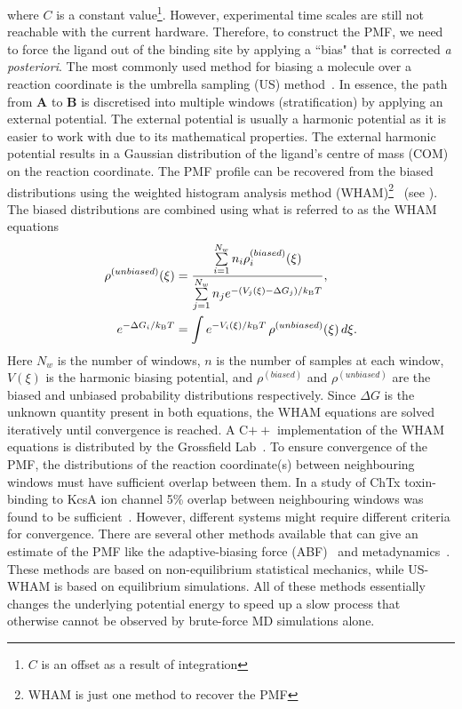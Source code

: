 where $C$ is a constant value\footnote{$C$ is an offset as a result of integration}. However, 
experimental time scales are still not reachable with the current hardware. Therefore, to 
construct the PMF, we need to force the ligand out of the binding site by applying a ``bias" 
that is corrected {\it a posteriori}. The most commonly used method for biasing a molecule over 
a reaction coordinate is the umbrella sampling (US) method~\cite{Torrie1977}. In essence, the 
path from \textbf{A} to \textbf{B} is discretised into multiple windows (stratification) by 
applying an external potential. The external potential is usually a harmonic potential as it 
is easier to work with due to its mathematical properties. The external harmonic potential 
results in a Gaussian distribution of the ligand's centre of mass (COM) on the reaction 
coordinate. The PMF profile can be recovered from the biased distributions using the weighted 
histogram analysis method (WHAM)\footnote{WHAM is just one method to recover the PMF}~\cite{Kumar1992} 
(see ). The biased distributions are combined using what is referred to as 
the WHAM equations
\begin{subequations}
\begin{align}
\rho^{(unbiased)}(\xi) &= \frac{\sum\limits_{i=1}^{N_{w}} n_{i}\rho_{i}^{(biased)}(\xi)}
{\sum\limits_{j=1}^{N_{w}}n_{j}e^{-(V_{j}(\xi)-\Delta G_{j})/k_{\text{B}}T}}, \\ 
e^{-\Delta G_{i}/k_{\text{B}}T} &= \int e^{-V_{i}(\xi)/k_{\text{B}}T}\,\rho^{(unbiased)}(\xi)\, d\xi.
\end{align}
\end{subequations}
Here $N_{w}$ is the number of windows, $n$ is the number of samples at each window, $V(\xi)$ is 
the harmonic biasing potential, and $\rho^{(biased)}$ and $\rho^{(unbiased)}$ are the biased and 
unbiased probability distributions respectively. Since $\Delta G$ is the unknown quantity present 
in both equations, the WHAM equations are solved iteratively until convergence is reached. A C$++$ 
implementation of the WHAM equations is distributed by the Grossfield Lab~\cite{Grossfield2013}. 
To ensure convergence of the PMF, the distributions of the reaction coordinate(s) between 
neighbouring windows must have sufficient overlap between them. In a study of ChTx toxin-binding 
to KcsA ion channel 5\% overlap between neighbouring windows was found to be sufficient~\cite{Chen2011}.
However, different systems might require different criteria for convergence. There are several 
other methods available that can give an estimate of the PMF like the adaptive-biasing force 
(ABF)~\cite{Darve2008} and metadynamics~\cite{Laio2008}. These methods are based on non-equilibrium 
statistical mechanics, while US-WHAM is based on equilibrium simulations. All of these methods 
essentially changes the underlying potential energy to speed up a slow process that 
otherwise cannot be observed by brute-force MD simulations alone.

